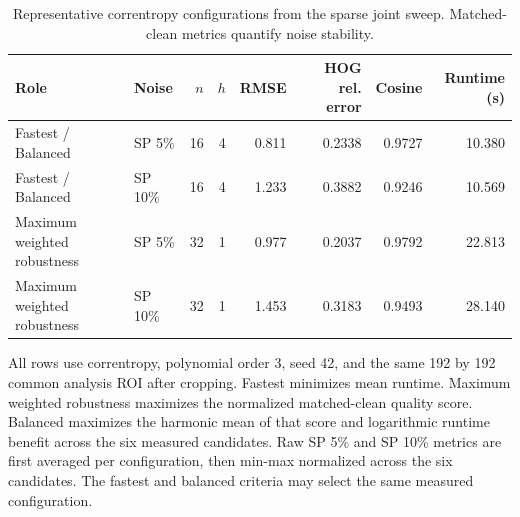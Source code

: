 \begin{table}[t]
\centering
\caption{Representative correntropy configurations from the sparse joint sweep. Matched-clean metrics quantify noise stability.}
\label{tab:parameter-summary}
\small
\setlength{\tabcolsep}{3.5pt}
\begin{tabular}{llrrrrrr}
\toprule
Role & Noise & $n$ & $h$ & RMSE & HOG rel. error & Cosine & Runtime (s) \\
\midrule
Fastest / Balanced & SP 5\% & 16 & 4 & 0.811 & 0.2338 & 0.9727 & 10.380 \\
Fastest / Balanced & SP 10\% & 16 & 4 & 1.233 & 0.3882 & 0.9246 & 10.569 \\
Maximum weighted robustness & SP 5\% & 32 & 1 & 0.977 & 0.2037 & 0.9792 & 22.813 \\
Maximum weighted robustness & SP 10\% & 32 & 1 & 1.453 & 0.3183 & 0.9493 & 28.140 \\
\bottomrule
\end{tabular}
\par\medskip
\footnotesize All rows use correntropy, polynomial order 3, seed 42, and the same 192 by 192 common analysis ROI after cropping. Fastest minimizes mean runtime. Maximum weighted robustness maximizes the normalized matched-clean quality score. Balanced maximizes the harmonic mean of that score and logarithmic runtime benefit across the six measured candidates. Raw SP 5\% and SP 10\% metrics are first averaged per configuration, then min-max normalized across the six candidates.
The fastest and balanced criteria may select the same measured configuration.
\end{table}
